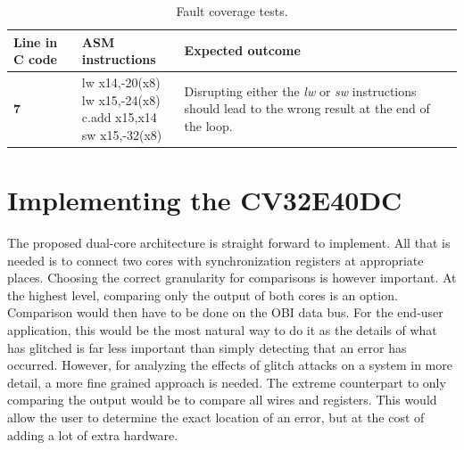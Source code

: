 \begin{table}[h]
\centering
\caption{Fault coverage tests.}
\label{tab:coverage_test}
\begin{tabular}{m{2.5cm}m{3.5cm}m{7.5cm}}
\toprule 
Line in C code & ASM instructions & Expected outcome \\
\midrule
\rowcolor{black!20} \textbf{7} & \makecell{lw	x14,-20(x8) \\ lw x15,-24(x8) \\ c.add x15,x14 \\ sw x15,-32(x8)} & Disrupting either the \textit{lw} or \textit{sw} instructions should lead to the wrong result at the end of the loop.\\
\bottomrule
\end{tabular}
\end{table}

\section{Implementing the CV32E40DC}
\label{sec:dualcore}

The proposed dual-core architecture is straight forward to implement. All that is needed is to connect two cores with synchronization registers at appropriate places. Choosing the correct granularity for comparisons is however important. At the highest level, comparing only the output of both cores is an option. Comparison would then have to be done on the OBI data bus. For the end-user application, this would be the most natural way to do it as the details of what has glitched is far less important than simply detecting that an error has occurred. However, for analyzing the effects of glitch attacks on a system in more detail, a more fine grained approach is needed. The extreme counterpart to only comparing the output would be to compare all wires and registers. This would allow the user to determine the exact location of an error, but at the cost of adding a lot of extra hardware. 

